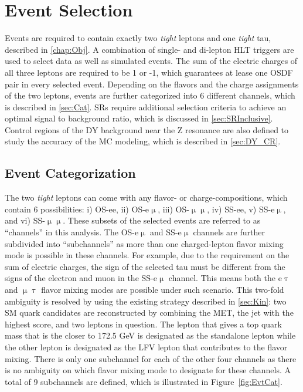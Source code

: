 \chapter{Event Selection}
\label{chap:Evt}

Events are required to contain exactly two \emph{tight} leptons and one \emph{tight} tau, described in \autoref{chap:Obj}. A combination of single- and di-lepton \ac{HLT} triggers are used to select data as well as simulated events. The sum of the electric charges of all three leptons are required to be 1 or -1, which guarantees at lease one \ac{OSDF} pair in every selected event. Depending on the flavors and the charge assignments of the two leptons, events are further categorized into 6 different channels, which is described in \autoref{sec:Cat}. \acp{SR} require additional selection criteria to achieve an optimal signal to background ratio, which is discussed in \autoref{sec:SRInclusive}. Control regions of the \ac{DY} background near the Z resonance are also defined to study the accuracy of the \ac{MC} modeling, which is described in \autoref{sec:DY_CR}. 
\section{Event Categorization}
\label{sec:Cat}

The two \emph{tight} leptons can come with any flavor- or charge-compositions, which contain 6 possibilities: i) \ac{OS}-ee, ii) \ac{OS}-e$\upmu$, iii) \ac{OS}-$\upmu\upmu$, iv) \ac{SS}-ee, v) \ac{SS}-e$\upmu$, and vi) \ac{SS}-$\upmu\upmu$. These subsets of the selected events are referred to as ``channels'' in this analysis. The \ac{OS}-e$\upmu$ and \ac{SS}-e$\upmu$ channels are further subdivided into ``subchannels'' as more than one charged-lepton flavor mixing mode is possible in these channels. For example, due to the requirement on the sum of electric charges, the sign of the selected tau must be different from the signs of the electron and muon in the \ac{SS}-e$\upmu$ channel. This means both the e$\uptau$ and $\upmu\uptau$ flavor mixing modes are possible under such scenario. This two-fold ambiguity is resolved by using the existing strategy described in \autoref{sec:Kin}: two \ac{SM} quark candidates are reconstructed by combining the \ac{MET}, the jet with the highest \DeepJ score, and two leptons in question. The lepton that gives a top quark mass that is the closer to 172.5 GeV is designated as the standalone lepton while the other lepton is designated as the LFV lepton that contributes to the flavor mixing. There is only one subchannel for each of the other four channels as there is no ambiguity on which flavor mixing mode to designate for these channels. A total of 9 subchannels are defined, which is illustrated in Figure~\ref{fig:EvtCat}. 

